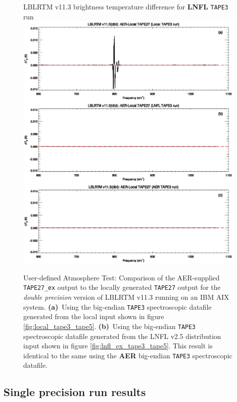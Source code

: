 \begin{figure}[htp]
  \qquad\textsf{LBLRTM v11.3 brightness temperature difference for \textbf{LNFL} \texttt{TAPE3} run}\\
  \includegraphics[bb=82 313 534 472,clip,scale=1.0]{graphics/run_example_user_defined_upwelling/ibm/dbl.eps}
  \caption{User-defined Atmosphere Test: Comparison of the AER-supplied \texttt{TAPE27\_ex} output to the locally generated \texttt{TAPE27} output for the \textsl{double precision} version of LBLRTM v11.3 running on an IBM AIX system. \mbox{\textbf{(a)} Using} the big-endian \texttt{TAPE3} spectroscopic datafile generated from the local input shown in figure \ref{fig:local_tape3_tape5}. \mbox{\textbf{(b)} Using} the big-endian \texttt{TAPE3} spectroscopic datafile generated from the LNFL v2.5 distribution input shown in figure \ref{fig:lnfl_ex_tape3_tape5}. This result is identical to the same using the \textbf{AER} big-endian \texttt{TAPE3} spectroscopic datafile.}
  \label{fig:run_example_user_defined_upwelling-dbl_ibm}
\end{figure}


\subsection{Single precision run results}


